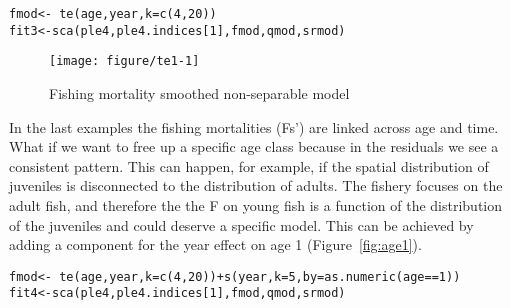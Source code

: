 \documentclass[a4paper,english,10pt]{article}\usepackage[]{graphicx}\usepackage[]{color}
\makeatletter
\def\maxwidth{ %
  \ifdim\Gin@nat@width>\linewidth
    \linewidth
  \else
    \Gin@nat@width
  \fi
}
\newcommand{\hlnum}[1]{\textcolor[rgb]{0.2,0.2,0.2}{#1}}%
\newcommand{\hlopt}[1]{\textcolor[rgb]{0.2,0.2,0.2}{#1}}%
\newcommand{\hlstd}[1]{\textcolor[rgb]{0,0,0}{#1}}%
\newcommand{\hlkwb}[1]{\textcolor[rgb]{0.361,0.506,0.596}{#1}}%
\newcommand{\hlkwc}[1]{\textcolor[rgb]{0.361,0.506,0.596}{#1}}%
\newcommand{\hlkwd}[1]{\textcolor[rgb]{0.361,0.506,0.596}{#1}}%
\newenvironment{kframe}{%
 \def\at@end@of@kframe{}%
 \ifinner\ifhmode%
  \def\at@end@of@kframe{\end{minipage}}%
  \begin{minipage}{\columnwidth}%
 \fi\fi%
 \def\FrameCommand##1{\hskip\@totalleftmargin \hskip-\fboxsep
 \colorbox{shadecolor}{##1}\hskip-\fboxsep
     \hskip-\linewidth \hskip-\@totalleftmargin \hskip\columnwidth}%
 \MakeFramed {\advance\hsize-\width
   \@totalleftmargin\z@ \linewidth\hsize
   \@setminipage}}%
 {\par\unskip\endMakeFramed%
 \at@end@of@kframe}
\newenvironment{knitrout}{}{} %
\makeatother
\begin{document}
\begin{knitrout}
\color{fgcolor}\begin{kframe}
\begin{alltt}
\hlstd{fmod} \hlkwb{<-} \hlopt{~} \hlkwd{te}\hlstd{(age, year,} \hlkwc{k} \hlstd{=} \hlkwd{c}\hlstd{(}\hlnum{4}\hlstd{,}\hlnum{20}\hlstd{))}
\hlstd{fit3} \hlkwb{<-} \hlkwd{sca}\hlstd{(ple4, ple4.indices[}\hlnum{1}\hlstd{], fmod, qmod, srmod)}
\end{alltt}
\end{kframe}
\end{knitrout}

\begin{knitrout}
\color{fgcolor}\begin{figure}[H]

{\centering \texttt{[image: figure/te1-1]} 

}

\caption[Fishing mortality smoothed non-separable model]{Fishing mortality smoothed non-separable model}\label{fig:te1}
\end{figure}


\end{knitrout}

In the last examples the fishing mortalities (Fs') are linked across age and time.  What if we want to free up a specific age class because in the residuals we see a consistent pattern.  This can happen, for example, if the spatial distribution of juveniles is disconnected to the distribution of adults.  The fishery focuses on the adult fish, and therefore the the F on young fish is a function of the distribution of the juveniles and could deserve a specific model. This can be achieved by adding a component for the year effect on age 1 (Figure~\ref{fig:age1}).

\begin{knitrout}
\color{fgcolor}\begin{kframe}
\begin{alltt}
\hlstd{fmod} \hlkwb{<-} \hlopt{~} \hlkwd{te}\hlstd{(age, year,} \hlkwc{k} \hlstd{=} \hlkwd{c}\hlstd{(}\hlnum{4}\hlstd{,}\hlnum{20}\hlstd{))} \hlopt{+} \hlkwd{s}\hlstd{(year,} \hlkwc{k} \hlstd{=} \hlnum{5}\hlstd{,} \hlkwc{by} \hlstd{=} \hlkwd{as.numeric}\hlstd{(age}\hlopt{==}\hlnum{1}\hlstd{))}
\hlstd{fit4} \hlkwb{<-} \hlkwd{sca}\hlstd{(ple4, ple4.indices[}\hlnum{1}\hlstd{], fmod, qmod, srmod)}
\end{alltt}
\end{kframe}
\end{knitrout}
\end{document}
